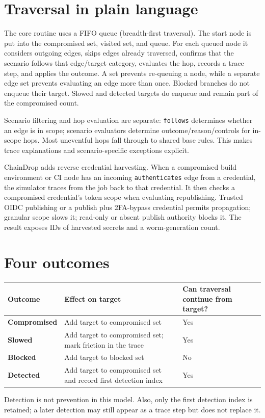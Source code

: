 \documentclass[11pt,oneside]{book}
\newcommand{\code}[1]{\texttt{\small #1}}
\begin{document}
\section{Traversal in plain language}
The core routine uses a FIFO queue (breadth-first traversal). The start node is put into the compromised set, visited set, and queue. For each queued node it considers outgoing edges, skips edges already traversed, confirms that the scenario follows that edge/target category, evaluates the hop, records a trace step, and applies the outcome. A set prevents re-queuing a node, while a separate edge set prevents evaluating an edge more than once. Blocked branches do not enqueue their target. Slowed and detected targets do enqueue and remain part of the compromised count.

Scenario filtering and hop evaluation are separate: \code{follows} determines whether an edge is in scope; scenario evaluators determine outcome/reason/controls for in-scope hops. Most uneventful hops fall through to shared base rules. This makes trace explanations and scenario-specific exceptions explicit.

ChainDrop adds reverse credential harvesting. When a compromised build environment or CI node has an incoming \code{authenticates} edge from a credential, the simulator traces from the job back to that credential. It then checks a compromised credential's token scope when evaluating republishing. Trusted OIDC publishing or a publish plus 2FA-bypass credential permits propagation; granular scope slows it; read-only or absent publish authority blocks it. The result exposes IDs of harvested secrets and a worm-generation count.

\section{Four outcomes}
\begin{center}\begin{tabularx}{\textwidth}{>{\bfseries}p{} X X}\toprule
Outcome & Effect on target & Can traversal continue from target?\\\midrule
Compromised & Add target to compromised set & Yes\\
Slowed & Add target to compromised set; mark friction in the trace & Yes\\
Blocked & Add target to blocked set & No\\
Detected & Add target to compromised set and record first detection index & Yes\\\bottomrule
\end{tabularx}\end{center}
Detection is not prevention in this model. Also, only the first detection index is retained; a later detection may still appear as a trace step but does not replace it.
\end{document}
